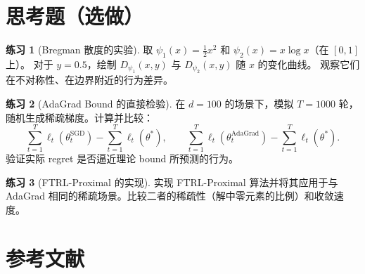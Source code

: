 \documentclass[12pt,a4paper]{ctexart}
\theoremstyle{definition}
\newtheorem{exercise}{练习}[section]
\theoremstyle{plain}
\theoremstyle{remark}
\begin{document}
\section{思考题（选做）}

\begin{exercise}[Bregman 散度的实验]
取 $\psi_1(x) = \frac{1}{2}x^2$ 和 $\psi_2(x) = x\log x$（在 $[0,1]$ 上）。
对于 $y=0.5$，绘制 $D_{\psi_1}(x, y)$ 与 $D_{\psi_2}(x, y)$ 随 $x$ 的变化曲线。
观察它们在不对称性、在边界附近的行为差异。
\end{exercise}

\begin{exercise}[AdaGrad Bound 的直接检验]
在 $d=100$ 的场景下，模拟 $T=1000$ 轮，随机生成稀疏梯度。计算并比较：
\[
  \sum_{t=1}^{T} \ell_t(\theta_t^{\mathrm{SGD}}) - \sum_{t=1}^{T} \ell_t(\theta^*),
  \qquad
  \sum_{t=1}^{T} \ell_t(\theta_t^{\mathrm{AdaGrad}}) - \sum_{t=1}^{T} \ell_t(\theta^*).
\]
验证实际 regret 是否逼近理论 bound 所预测的行为。
\end{exercise}

\begin{exercise}[FTRL-Proximal 的实现]
实现 FTRL-Proximal 算法并将其应用于与 AdaGrad 相同的稀疏场景。比较二者的稀疏性（解中零元素的比例）和收敛速度。
\end{exercise}

\section*{参考文献}
\end{document}

